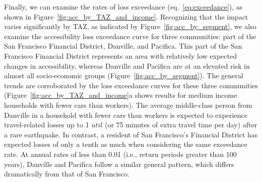 Finally, we can examine the rates of loss exceedance (eq.~\ref{eq:exceedance}), as shown in Figure~\ref{fig:acc_by_TAZ_and_income}.  %
Recognizing that the impact varies significantly by TAZ, as indicated by Figure~\ref{fig:acc_by_segment},
we also examine the accessibility loss exceedance curve for three communities: part of the San Francisco Financial District, Danville, and Pacifica. This part of the San Francisco Financial District  represents an area with relatively low expected changes in accessibility, whereas Danville and Pacifica are at an elevated risk in almost all socio-economic groups (Figure~\ref{fig:acc_by_segment}). 
The general trends are corroborated by the loss exceedance curves for these three communities (Figure~\ref{fig:acc_by_TAZ_and_income}{a} shows results for medium income households with fewer cars than workers). The average middle-class person from Danville in a household with fewer cars than workers is expected to experience travel-related losses up to 1 $util$ (or 75 minutes of extra travel time per day) after a rare earthquake. In contrast, a resident of San Francisco's Financial District has expected losses of only a tenth as much when considering the same exceedance rate. At annual rates of less than 0.01 (i.e., return periods greater than 100 years), Danville and Pacifica follow a similar general pattern, which differs dramatically from that of San Francisco. 

